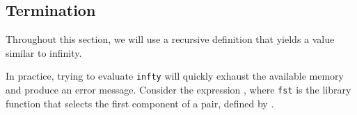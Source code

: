 \subsection{Termination}\label{subsec:Termination}
Throughout this section, we will use a recursive definition that yields a value similar to infinity.

In practice, trying to evaluate \texttt{infty} will quickly exhaust the available memory and produce an error message.
Consider the expression , where \texttt{fst} is the library function that selects the first component of a pair, defined by .

